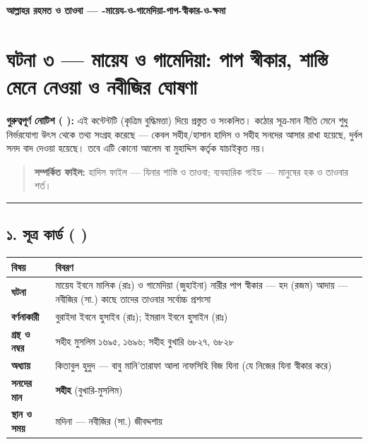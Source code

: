 

\begin{center}{\Large\bfseries\color{emerald} আল্লাহর রহমত ও তাওবা — -মায়েয-ও-গামেদিয়া-পাপ-স্বীকার-ও-ক্ষমা}\end{center}
\vspace{1em}
\section*{ঘটনা ৩ — মায়েয ও গামেদিয়া: পাপ স্বীকার, শাস্তি মেনে নেওয়া ও নবীজির ঘোষণা}

\begin{warnbox}
 \textbf{গুরুত্বপূর্ণ নোটিশ ( ):} এই কন্টেন্টটি  (কৃত্রিম বুদ্ধিমত্তা) দিয়ে প্রস্তুত ও সংকলিত।  কঠোর সূত্র-মান নীতি মেনে শুধু নির্ভরযোগ্য উৎস থেকে তথ্য সংগ্রহ করেছে — কেবল সহীহ/হাসান হাদিস ও সহীহ সনদের আসার রাখা হয়েছে, দুর্বল সনদ বাদ দেওয়া হয়েছে। তবে এটি কোনো আলেম বা মুহাদ্দিস কর্তৃক যাচাইকৃত নয়।
\end{warnbox}

\begin{quote}
\textbf{সম্পর্কিত ফাইল:} হাদিস ফাইল — যিনার শাস্তি ও তাওবা; ব্যবহারিক গাইড — মানুষের হক ও তাওবার শর্ত।
\end{quote}

\medskip\hrule\medskip

\subsection*{১. সূত্র কার্ড ( )}

\begin{table}[h]\centering\small
\begin{tabular}{ll}
বিষয় & বিবরণ \\
\hline
\textbf{ঘটনা} & মায়েয ইবনে মালিক (রাঃ) ও গামেদিয়া (জুহাইনা) নারীর পাপ স্বীকার — হদ (রজম) আদায় — নবীজির (সা.) কাছে তাদের তাওবার সর্বোচ্চ প্রশংসা \\
\textbf{বর্ণনাকারী} & বুরাইদা ইবনে হুসাইব (রাঃ); ইমরান ইবনে হুসাইন (রাঃ) \\
\textbf{গ্রন্থ ও নম্বর} & সহীহ মুসলিম ১৬৯৫, ১৬৯৬; সহীহ বুখারি ৬৮২৭, ৬৮২৮ \\
\textbf{অধ্যায়} & কিতাবুল হুদুদ — বাবু মানি'তারাফা আলা নাফসিহি বিজ যিনা (যে নিজের যিনা স্বীকার করে) \\
\textbf{সনদের মান} & \textbf{সহীহ} (বুখারি-মুসলিম) \\
\textbf{স্থান ও সময়} & মদিনা — নবীজির (সা.) জীবদ্দশায় \\
\hline
\end{tabular}
\end{table}

